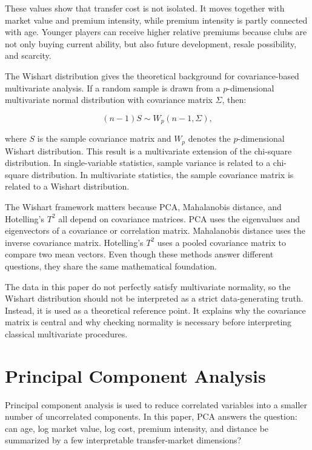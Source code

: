\documentclass[12pt]{article}
\begin{document}
These values show that transfer cost is not isolated. It moves together with market value and premium intensity, while premium intensity is partly connected with age. Younger players can receive higher relative premiums because clubs are not only buying current ability, but also future development, resale possibility, and scarcity.

The Wishart distribution gives the theoretical background for covariance-based multivariate analysis. If a random sample is drawn from a $p$-dimensional multivariate normal distribution with covariance matrix $\Sigma$, then:

\begin{equation}
(n-1)S \sim W_p(n-1, \Sigma),
\end{equation}

where $S$ is the sample covariance matrix and $W_p$ denotes the $p$-dimensional Wishart distribution. This result is a multivariate extension of the chi-square distribution. In single-variable statistics, sample variance is related to a chi-square distribution. In multivariate statistics, the sample covariance matrix is related to a Wishart distribution.

The Wishart framework matters because PCA, Mahalanobis distance, and Hotelling's $T^2$ all depend on covariance matrices. PCA uses the eigenvalues and eigenvectors of a covariance or correlation matrix. Mahalanobis distance uses the inverse covariance matrix. Hotelling's $T^2$ uses a pooled covariance matrix to compare two mean vectors. Even though these methods answer different questions, they share the same mathematical foundation.

The data in this paper do not perfectly satisfy multivariate normality, so the Wishart distribution should not be interpreted as a strict data-generating truth. Instead, it is used as a theoretical reference point. It explains why the covariance matrix is central and why checking normality is necessary before interpreting classical multivariate procedures.

\section{Principal Component Analysis}

Principal component analysis is used to reduce correlated variables into a smaller number of uncorrelated components. In this paper, PCA answers the question: can age, log market value, log cost, premium intensity, and distance be summarized by a few interpretable transfer-market dimensions?
\end{document}
